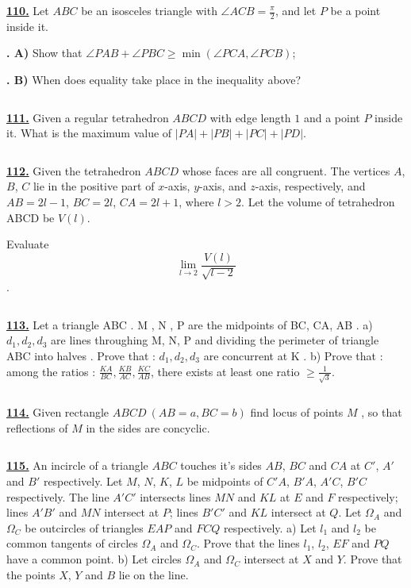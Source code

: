 \documentclass{article}
\begin{document}
$$ $$


\href{ http://www.artofproblemsolving.com/Forum/viewtopic.php?p=159507#p159507
}{\bf 110.} Let $ABC$ be an isosceles triangle with $\angle ACB=\frac\pi 2$, and let $P$ be a point inside it.

{\bf. A)} Show that $\angle PAB+\angle PBC\ge\min(\angle PCA,\angle PCB)$;

{\bf. B)} When does equality take place in the inequality above?


$$ $$


\href{ http://www.artofproblemsolving.com/Forum/viewtopic.php?p=117329#p117329
}{\bf 111.} Given a regular  tetrahedron   $ABCD$   with edge length $1$ and a point $P$ inside it.
What is the maximum value of   $\left|PA\right|+\left|PB\right|+\left|PC\right|+\left|PD\right|$.


$$ $$


\href{ http://www.artofproblemsolving.com/Forum/viewtopic.php?p=134422#p134422
}{\bf 112.} Given the tetrahedron $ABCD$ whose faces are all congruent. The vertices $A$, $B$, $C$ lie in the positive part of $x$-axis, $y$-axis, and $z$-axis, respectively, and $AB=2l-1$, $BC=2l$, $CA=2l+1$, where $l>2$. Let the volume of tetrahedron ABCD be $V\left(l\right)$.

Evaluate $$\lim_{l\to 2} \frac{V\left(l\right)}{\sqrt{l-2}}$$.


$$ $$


\href{http://www.artofproblemsolving.com/Forum/viewtopic.php?p=134462#p134462
 }{\bf 113.} Let a triangle ABC . M , N , P are the midpoints of BC, CA, AB .
a) $d_1, d_2, d_3$ are lines throughing M, N, P and dividing the perimeter of triangle ABC into halves . Prove that : $d_1, d_2, d_3$ are concurrent at K .
b) Prove that : among the ratios : $\frac{KA}{BC}, \frac{KB}{AC}, \frac{KC}{AB}$, there exists at least one ratio $\geq \frac{1}{\sqrt3}$.


$$ $$


\href{http://www.artofproblemsolving.com/Forum/viewtopic.php?p=133409#p133409
 }{\bf 114.} Given rectangle $ABCD \ (AB=a,BC=b)$  find locus of points $M$ , so that reflections of $M$  in the sides are concyclic.


$$ $$


\href{http://www.artofproblemsolving.com/Forum/viewtopic.php?p=136311#p136311
 }{\bf 115.} An incircle of a triangle $ABC$ touches it's sides $AB$, $BC$ and $CA$ at $C'$, $A'$ and $B'$ respectively. Let $M$, $N$, $K$, $L$ be midpoints of $C'A$, $B'A$, $A'C$, $B'C$ respectively. The line $A'C'$ intersects lines $MN$ and $KL$ at $E$ and $F$ respectively; lines $A'B'$ and $MN$ intersect at $P$; lines $B'C'$ and $KL$ intersect at $Q$. Let $\Omega_A$ and $\Omega_C$ be outcircles of triangles $EAP$ and $FCQ$ respectively.
a) Let $l_1$ and $l_2$ be common tangents of circles $\Omega_A$ and $\Omega_C$. Prove that the lines $l_1$, $l_2$, $EF$ and $PQ$ have a common point.
b) Let circles $\Omega_A$ and $\Omega_C$ intersect at $X$ and $Y$. Prove that the points $X$, $Y$ and $B$ lie on the line.
\end{document}
